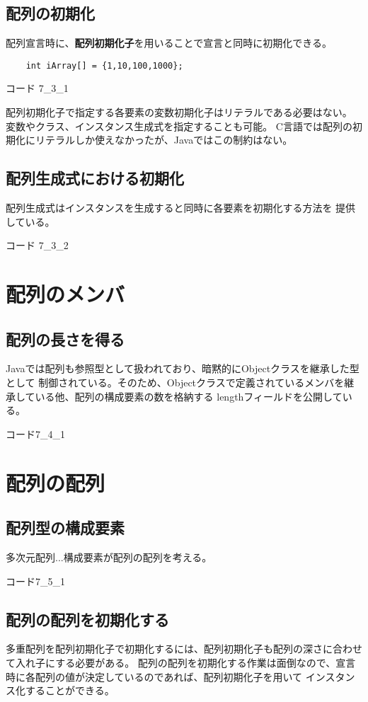 \documentclass[12pt,a4j,twoside]{jsbook}
\begin{document}
\subsection{配列の初期化}
配列宣言時に、\textbf{配列初期化子}を用いることで宣言と同時に初期化できる。

\begin{lstlisting}
    int iArray[] = {1,10,100,1000};
\end{lstlisting}
コード 7\_3\_1

配列初期化子で指定する各要素の変数初期化子はリテラルである必要はない。
変数やクラス、インスタンス生成式を指定することも可能。
C言語では配列の初期化にリテラルしか使えなかったが、Javaではこの制約はない。

\subsection{配列生成式における初期化}
配列生成式はインスタンスを生成すると同時に各要素を初期化する方法を
提供している。

コード 7\_3\_2

\section{配列のメンバ}
\subsection{配列の長さを得る}
Javaでは配列も参照型として扱われており、暗黙的にObjectクラスを継承した型として
制御されている。そのため、Objectクラスで定義されているメンバを継承している他、配列の構成要素の数を格納する
lengthフィールドを公開している。

コード7\_4\_1

\section{配列の配列}
\subsection{配列型の構成要素}
多次元配列...構成要素が配列の配列を考える。

コード7\_5\_1

\subsection{配列の配列を初期化する}
多重配列を配列初期化子で初期化するには、配列初期化子も配列の深さに合わせて入れ子にする必要がある。
配列の配列を初期化する作業は面倒なので、宣言時に各配列の値が決定しているのであれば、配列初期化子を用いて
インスタンス化することができる。
\end{document}
